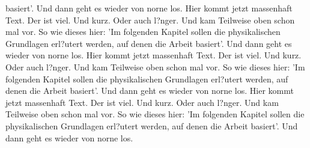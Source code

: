 basiert'.  Und dann geht es wieder von norne los. Hier kommt jetzt massenhaft Text. Der ist viel. Und kurz. Oder auch l?nger. Und kam Teilweise oben schon mal vor. So wie dieses hier: 'Im folgenden Kapitel sollen die physikalischen Grundlagen erl?utert werden, auf denen die Arbeit basiert'.  Und dann geht es wieder von norne los. Hier kommt jetzt massenhaft Text. Der ist viel. Und kurz. Oder auch l?nger. Und kam Teilweise oben schon mal vor. So wie dieses hier: 'Im folgenden Kapitel sollen die physikalischen Grundlagen erl?utert werden, auf denen die Arbeit basiert'.  Und dann geht es wieder von norne los. Hier kommt jetzt massenhaft Text. Der ist viel. Und kurz. Oder auch l?nger. Und kam Teilweise oben schon mal vor. So wie dieses hier: 'Im folgenden Kapitel sollen die physikalischen Grundlagen erl?utert werden, auf denen die Arbeit basiert'.  Und dann geht es wieder von norne los. 


